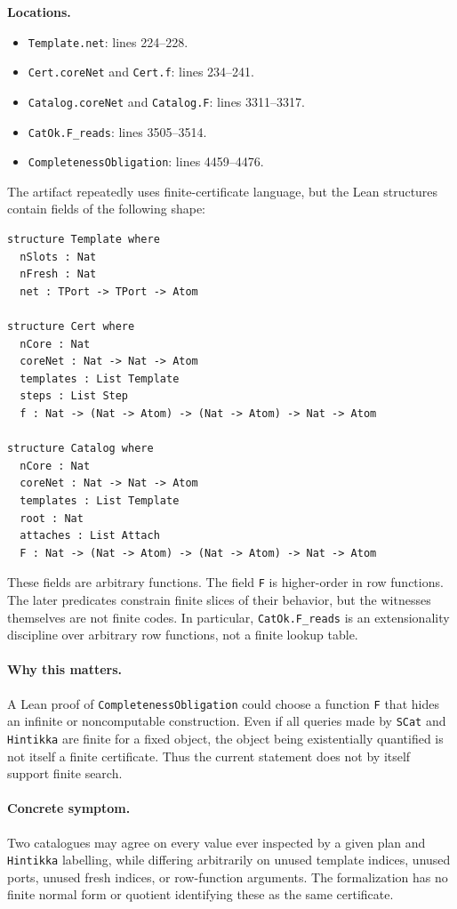 \documentclass[11pt]{article}
\begin{document}
\textbf{Locations.}
\begin{itemize}
  \item \texttt{Template.net}: lines 224--228.
  \item \texttt{Cert.coreNet} and \texttt{Cert.f}: lines 234--241.
  \item \texttt{Catalog.coreNet} and \texttt{Catalog.F}: lines 3311--3317.
  \item \texttt{CatOk.F\_reads}: lines 3505--3514.
  \item \texttt{CompletenessObligation}: lines 4459--4476.
\end{itemize}

The artifact repeatedly uses finite-certificate language, but the Lean
structures contain fields of the following shape:

\begin{lstlisting}
structure Template where
  nSlots : Nat
  nFresh : Nat
  net : TPort -> TPort -> Atom

structure Cert where
  nCore : Nat
  coreNet : Nat -> Nat -> Atom
  templates : List Template
  steps : List Step
  f : Nat -> (Nat -> Atom) -> (Nat -> Atom) -> Nat -> Atom

structure Catalog where
  nCore : Nat
  coreNet : Nat -> Nat -> Atom
  templates : List Template
  root : Nat
  attaches : List Attach
  F : Nat -> (Nat -> Atom) -> (Nat -> Atom) -> Nat -> Atom
\end{lstlisting}

These fields are arbitrary functions.  The field \texttt{F} is higher-order in
row functions.  The later predicates constrain finite slices of their behavior,
but the witnesses themselves are not finite codes.  In particular,
\texttt{CatOk.F\_reads} is an extensionality discipline over arbitrary row
functions, not a finite lookup table.

\paragraph{Why this matters.}
A Lean proof of \texttt{CompletenessObligation} could choose a function
\texttt{F} that hides an infinite or noncomputable construction.  Even if all
queries made by \texttt{SCat} and \texttt{Hintikka} are finite for a fixed
object, the object being existentially quantified is not itself a finite
certificate.  Thus the current statement does not by itself support finite
search.

\paragraph{Concrete symptom.}
Two catalogues may agree on every value ever inspected by a given plan and
\texttt{Hintikka} labelling, while differing arbitrarily on unused template
indices, unused ports, unused fresh indices, or row-function arguments.  The
formalization has no finite normal form or quotient identifying these as the
same certificate.
\end{document}
